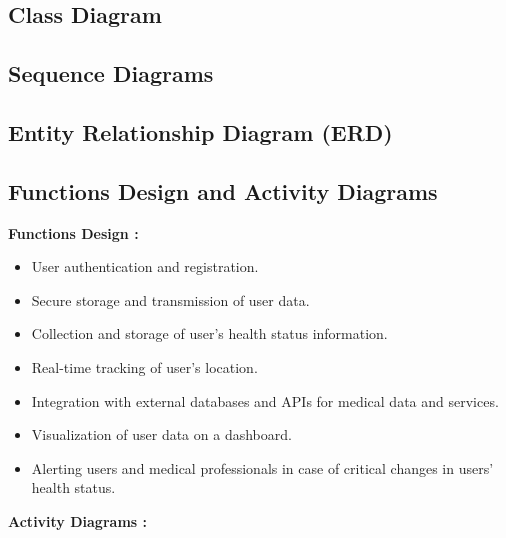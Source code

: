 \documentclass[12pt]{article}
\begin{document}
		
			\subsection{Class Diagram}
			\subsection{Sequence Diagrams}
			\subsection{Entity Relationship Diagram (ERD)}
			\subsection{Functions Design and Activity Diagrams}
			\textbf{Functions Design :}
			\begin{itemize}
				\item User authentication and registration.
				\item Secure storage and transmission of user data.
				\item Collection and storage of user's health status information.
				\item Real-time tracking of user's location.
				\item Integration with external databases and APIs for medical data and services.
				\item Visualization of user data on a dashboard.
				\item Alerting users and medical professionals in case of critical changes in users’ health status.
				
			\end{itemize}
			\textbf{Activity Diagrams :}
\end{document}
